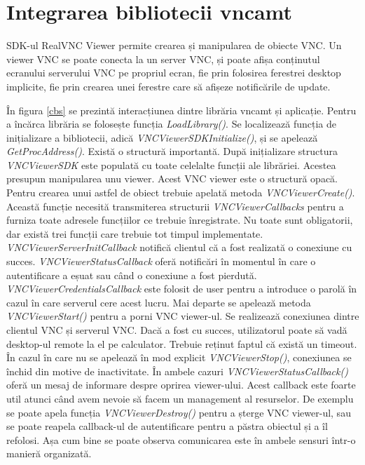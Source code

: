 \section{Integrarea bibliotecii vncamt}

SDK-ul RealVNC Viewer permite crearea și manipularea de obiecte VNC. Un viewer VNC se poate conecta la un server VNC, și poate afișa conținutul ecranului serverului VNC pe propriul ecran, fie prin folosirea ferestrei desktop implicite, fie prin crearea unei ferestre care să afișeze notificările de update. 



În figura \ref{cbs} se prezintă interacțiunea dintre librăria vncamt și aplicație. Pentru a încărca librăria se folosește funcția \textit{LoadLibrary()}. Se localizează funcția de inițializare a bibliotecii, adică \textit{VNCViewerSDKInitialize()}, și se apelează \textit{GetProcAddress()}. Există o structură importantă. După inițializare structura \textit{VNCViewerSDK} este populată cu toate celelalte funcții ale librăriei. Acestea presupun manipularea unu viewer. Acest VNC viewer este o structură opacă. Pentru crearea unui astfel de obiect trebuie apelată metoda \textit{VNCViewerCreate()}. Această funcție necesită transmiterea structurii \textit{VNCViewerCallbacks} pentru a furniza toate adresele funcțiilor ce trebuie înregistrate. Nu toate sunt obligatorii, dar există trei funcții care trebuie tot timpul implementate. \textit{VNCViewerServerInitCallback} notifică clientul că a fost realizată o conexiune cu succes. \textit{VNCViewerStatusCallback} oferă notificări în momentul în care o autentificare a eșuat sau când o conexiune a fost pierdută. \textit{VNCViewerCredentialsCallback} este folosit de user pentru a introduce o parolă în cazul în care serverul cere acest lucru. Mai departe se apelează metoda \textit{VNCViewerStart()} pentru a porni VNC viewer-ul. Se realizează conexiunea dintre clientul VNC și serverul VNC. Dacă a fost cu succes, utilizatorul poate să vadă desktop-ul remote la el pe calculator. Trebuie reținut faptul că există un timeout. În cazul în care nu se apelează în mod explicit \textit{VNCViewerStop()}, conexiunea se închid din motive de inactivitate. În ambele cazuri \textit{VNCViewerStatusCallback()} oferă un mesaj de informare despre oprirea viewer-ului. Acest callback este foarte util atunci când avem nevoie să facem un management al resurselor. De exemplu se poate apela funcția \textit{VNCViewerDestroy()} pentru a șterge VNC viewer-ul, sau se poate reapela callback-ul de autentificare pentru a păstra obiectul și a îl refolosi. Așa cum bine se poate observa comunicarea este în ambele sensuri într-o manieră organizată.

